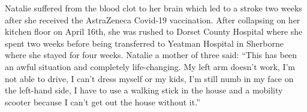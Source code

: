 Natalie suffered from the blood clot to her brain which led to a stroke two
weeks after she received the AstraZeneca Covid-19 vaccination.
After collapsing on her kitchen floor on April 16th, she was rushed to Dorset
County Hospital where she spent two weeks before being transferred to Yeatman
Hospital in Sherborne where she stayed for four weeks.
Natalie a mother of three said: ``This has been an awful situation and
completely life-changing. My left arm doesn't work, I'm not able to
drive, I can't dress myself or my kids, I'm still numb in my face
on the left-hand side, I have to use a walking stick in the house and a
mobility scooter because I can't get out the house without it.''
